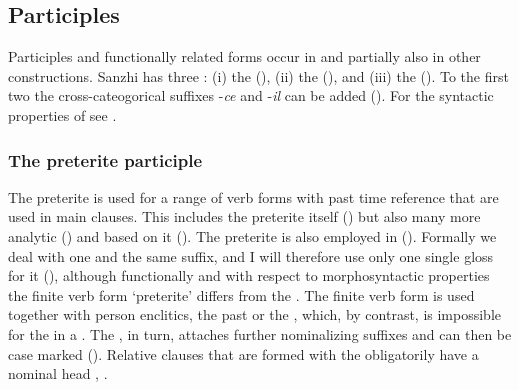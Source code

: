 \subsection{Participles}
\label{ssec:Participles and functionally related verb forms}

Participles and functionally related forms occur in  and partially also in other constructions. Sanzhi has three : (i) the  (), (ii) the  (), and (iii) the  (). To the first two  the cross-cateogorical suffixes -\textit{ce} and -\textit{il} can be added (). For the syntactic properties of  see .



\subsubsection{The preterite participle}
\label{sssec:The preterite participle}

The preterite is used for a range of verb forms with past time reference that are used in main clauses. This includes the preterite itself () but also many more analytic () and  based on it (). The preterite is also employed in  (). Formally we deal with one and the same suffix, and I will therefore use only one single gloss for it (), although functionally and with respect to morphosyntactic properties the finite verb form `preterite' differs from the . The finite verb form is used together with person enclitics, the past  or the , which, by contrast, is impossible for the  in a . The , in turn, attaches further nominalizing suffixes  and can then be case marked (). Relative clauses that are formed with the  obligatorily have a nominal head , . 


